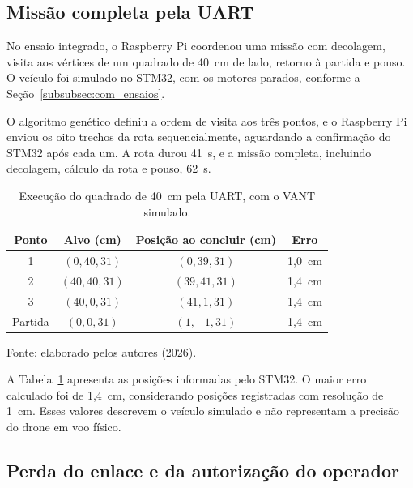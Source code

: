 \subsection{Missão completa pela UART}\label{subsec:res_com_missao}

No ensaio integrado, o Raspberry Pi coordenou uma missão com decolagem, visita aos vértices de um quadrado de 40~cm de lado, retorno à partida e pouso. O veículo foi simulado no STM32, com os motores parados, conforme a Seção~\ref{subsubsec:com_ensaios}.

O algoritmo genético definiu a ordem de visita aos três pontos, e o Raspberry Pi enviou os oito trechos da rota sequencialmente, aguardando a confirmação do STM32 após cada um. A rota durou 41~s, e a missão completa, incluindo decolagem, cálculo da rota e pouso, 62~s.


\begin{table}[H]
    \centering
    \caption{Execução do quadrado de 40~cm pela UART, com o VANT simulado.}
    \label{tab:com_quadrado}
    \small
    \renewcommand{\arraystretch}{1.2}
    \begin{tabular}{cccc}
        \hline
        \textbf{Ponto} & \textbf{Alvo (cm)} & \textbf{Posição ao concluir (cm)} & \textbf{Erro} \\
        \hline
        1 & $(0, 40, 31)$ & $(0, 39, 31)$ & 1,0~cm \\
        2 & $(40, 40, 31)$ & $(39, 41, 31)$ & 1,4~cm \\
        3 & $(40, 0, 31)$ & $(41, 1, 31)$ & 1,4~cm \\
        Partida & $(0, 0, 31)$ & $(1, -1, 31)$ & 1,4~cm \\
        \hline
    \end{tabular}
    \par\vspace{0.2cm}
    \footnotesize Fonte: elaborado pelos autores (2026).
\end{table}


A Tabela~\ref{tab:com_quadrado} apresenta as posições informadas pelo STM32. O maior erro calculado foi de 1,4~cm, considerando posições registradas com resolução de 1~cm. Esses valores descrevem o veículo simulado e não representam a precisão do drone em voo físico.

\subsection{Perda do enlace e da autorização do operador}\label{subsec:res_com_failsafe}

